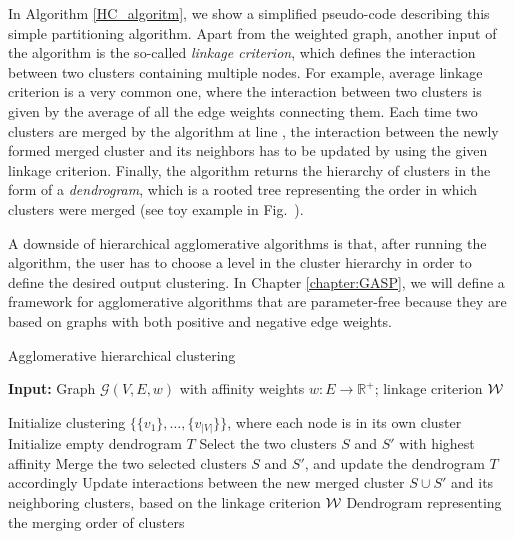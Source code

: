 In Algorithm \ref{HC_algoritm}, we show a simplified pseudo-code describing this simple partitioning algorithm. Apart from the weighted graph, another input of the algorithm is the so-called \emph{linkage criterion}, which defines the interaction between two clusters containing multiple nodes. For example, average linkage criterion is a very common one, where the interaction between two clusters is given by the average of all the edge weights connecting them. Each time two clusters are merged by the algorithm at line , the interaction between the newly formed merged cluster and its neighbors has to be updated by using the given linkage criterion. 
Finally, the algorithm returns the hierarchy of clusters in the form of a \emph{dendrogram}, which is a rooted tree representing the order in which clusters were merged (see toy example in Fig.~). 

A downside of hierarchical agglomerative algorithms is that, after running the algorithm, the user has to choose a level in the cluster hierarchy in order to define the desired output clustering. 
In Chapter \ref{chapter:GASP}, we will define a framework for agglomerative algorithms that are parameter-free because they are based on graphs with both positive and negative edge weights.

\begin{algorithm}[t]
\footnotesize
  \begin{flushleft}
  \footnotesize
  \caption{Agglomerative hierarchical clustering}
   \hspace*{\algorithmicindent} \textbf{Input:} Graph $\mathcal{G}(V,E,w)$ with affinity weights $w:E \rightarrow \mathbb{R}^+$; linkage criterion $\mathcal{W}{}$ \\
  \begin{algorithmic}[1]
  \footnotesize
      \State Initialize clustering $\{\{v_1\}, \ldots, \{v_{|V|}\}\}$, where each node is in its own cluster
      \State Initialize empty dendrogram $T$
      \Repeat 
        \State Select the two clusters $S$ and $S'$ with highest affinity
        \State Merge the two selected clusters $S$ and $S'$, and update the dendrogram $T$ accordingly
        \State Update interactions between the new merged cluster $S \cup S'$ and its neighboring clusters, based on the linkage criterion $\mathcal{W}{}$
      \State
      \Return Dendrogram representing the merging order of clusters
  \end{algorithmic}
    \label{HC_algoritm}
  \end{flushleft}

\end{algorithm}


